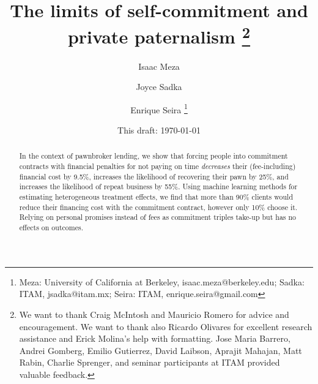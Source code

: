 \documentclass[oneside,11pt]{article}
\begin{document}
\title{The limits of self-commitment and private paternalism \thanks{We want to thank Craig McIntosh and Mauricio Romero for advice and encouragement. We want to thank also Ricardo Olivares for excellent research assistance and Erick Molina's help with formatting. Jose Maria Barrero, Andrei Gomberg, Emilio Gutierrez, David Laibson, Aprajit Mahajan, Matt Rabin, Charlie Sprenger, and seminar participants at ITAM provided valuable feedback.}}
\author{Isaac Meza \and Joyce Sadka \and Enrique Seira   \thanks{Meza: University of California at Berkeley, isaac.meza@berkeley.edu; Sadka: ITAM, jsadka@itam.mx;  
Seira: ITAM, enrique.seira@gmail.com} }
\date{This draft:  \today \\[2 cm]}



\maketitle
\thispagestyle{empty}
\begin{abstract}


In the context of pawnbroker lending, we show that forcing people into commitment contracts with financial penalties for not paying on time \textit{decreases} their (fee-including) financial cost by 9.5\%, increases the likelihood of recovering their pawn by 25\%, and increases the likelihood of repeat business by 55\%. Using machine learning methods for estimating heterogeneous treatment effects, we find that more than 90\% clients would reduce their financing cost with the commitment contract, however only 10\% choose it. Relying on personal promises instead of fees as commitment triples take-up but has no effects on outcomes.


\end{abstract}
\end{document}
